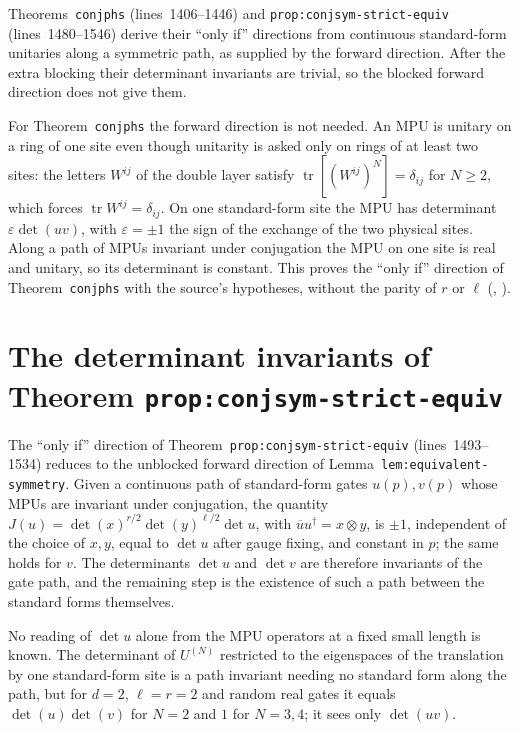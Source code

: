 \documentclass{article}
\begin{document}
Theorems~\texttt{conjphs} (lines~1406--1446) and
\texttt{prop:conjsym-strict-equiv} (lines~1480--1546) derive their ``only if''
directions from continuous standard-form unitaries along a symmetric path, as
supplied by the forward direction. After the extra blocking their determinant
invariants are trivial, so the blocked forward direction does not give them.

For Theorem~\texttt{conjphs} the forward direction is not needed. An MPU is
unitary on a ring of one site even though unitarity is asked only on rings of
at least two sites: the letters $W^{ij}$ of the double layer satisfy
$\operatorname{tr}[(W^{ij})^N]=\delta_{ij}$ for $N\geq2$, which forces
$\operatorname{tr}W^{ij}=\delta_{ij}$. On one standard-form site the MPU has
determinant $\varepsilon\det(uv)$, with $\varepsilon=\pm1$ the sign of the
exchange of the two physical sites. Along a path of MPUs invariant under
conjugation the MPU on one site is real and unitary, so its determinant is
constant. This proves the ``only if'' direction of Theorem~\texttt{conjphs}
with the source's hypotheses, without the parity of $r$ or $\ell$
(,
).

\section{The determinant invariants of Theorem \texttt{prop:conjsym-strict-equiv}}

The ``only if'' direction of Theorem~\texttt{prop:conjsym-strict-equiv}
(lines~1493--1534) reduces to the unblocked forward direction of
Lemma~\texttt{lem:equivalent-symmetry}. Given a continuous path of
standard-form gates $u(p),v(p)$ whose MPUs are invariant under conjugation,
the quantity $J(u)=\det(x)^{r/2}\det(y)^{\ell/2}\det u$, with
$\overline uu^\dagger=x\otimes y$, is $\pm1$, independent of the choice of
$x,y$, equal to $\det u$ after gauge fixing, and constant in $p$; the same holds
for $v$. The determinants $\det u$ and $\det v$ are therefore invariants of
the gate path, and the remaining step is the existence of such a path between
the standard forms themselves.

No reading of $\det u$ alone from the MPU operators at a fixed small length is
known. The determinant of $U^{(N)}$ restricted to the eigenspaces of the
translation by one standard-form site is a path invariant needing no standard
form along the path, but for $d=2$, $\ell=r=2$ and random real gates it
equals $\det(u)\det(v)$ for $N=2$ and $1$ for $N=3,4$; it sees only
$\det(uv)$.
\end{document}
